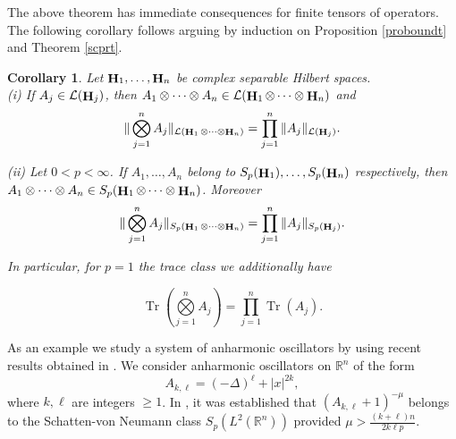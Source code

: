 \documentclass[a4paper,12pt,reqno]{amsart}
\newtheorem{cor}[thm]{Corollary}
\theoremstyle{definition}
\theoremstyle{remark}
\numberwithin{equation}{section}
\newcommand{\beq}{\begin{equation}}
\newcommand{\eq}{\end{equation}}
\DeclareMathOperator{\Tr}{Tr}
\def\Rn{{{\mathbb R}^n}}
\DeclareMathOperator{\Hi}{{\bf H}}
\begin{document}
The above theorem  has immediate consequences for finite tensors of operators. The following corollary follows arguing by induction on Proposition \ref{proboundt} and Theorem \ref{scprt}.

\begin{cor} \label{corsp} Let $\Hi_1,\dots,\Hi_n$  be complex separable Hilbert spaces.\\
(i)  If $A_j\in \mathcal{L}(\Hi_j)$, then $A_1\otimes\cdots \otimes A_n\in \mathcal{L}(\Hi_1\otimes\cdots\otimes \Hi_n)$
 and 
 \[\|\bigotimes \limits_{j=1}^nA_j\|_{\mathcal{L}(\Hi_1\otimes\cdots\otimes \Hi_n)}=\prod\limits_{j=1}^{n}\|A_j\|_{\mathcal{L}(\Hi_j)}. \]

\noindent (ii) Let  $0<p<\infty$. If $A_1,\dots, A_n$ belong to $S_p(\Hi_1), \dots, S_p(\Hi_n)$ respectively, then $A_1\otimes\cdots \otimes A_n\in S_p(\Hi_1\otimes\cdots\otimes \Hi_n)$. Moreover 
\[\|\bigotimes \limits_{j=1}^nA_j\|_{S_p(\Hi_1\otimes\cdots\otimes \Hi_n)}=\prod\limits_{j=1}^{n}\|A_j\|_{S_p(\Hi_j)}.\]

In particular, for $p=1$ the trace class we additionally have 

\[\Tr\left(\bigotimes \limits_{j=1}^nA_j\right)=\prod\limits_{j=1}^{n}\Tr(A_j).\]	
\end{cor}%


As an example we study  a system of anharmonic oscillators by using recent results  obtained in \cite{anh:cdr}. We consider  anharmonic oscillators  on  $\Rn$  of the form
 \beq A_{k,\ell}=(-\Delta)^{\ell}+|x|^{2k} \label{gahw1},\eq
where $k,\ell$ are integers $\geq 1$. In \cite{anh:cdr}, it was established  that  $(A_{k,\ell}+1)^{-\mu}$ belongs to the Schatten-von Neumann class $S_p(L^2(\Rn))$ provided $\mu>\frac{(k+\ell)n}{2k\ell p} $.
\end{document}
